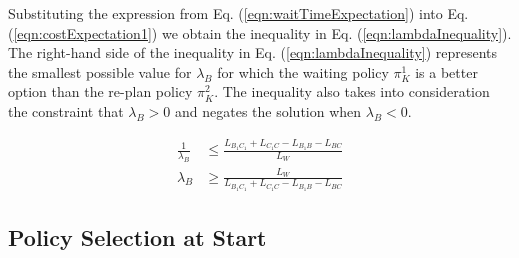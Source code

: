 \documentclass[a4paper,12pt]{article}
\begin{document}
			Substituting the expression from Eq. (\ref{eqn:waitTimeExpectation}) into Eq. (\ref{eqn:costExpectation1}) we obtain the inequality in Eq. (\ref{eqn:lambdaInequality}). The right-hand side of the inequality in Eq. (\ref{eqn:lambdaInequality}) represents the smallest possible value for $\lambda_{B}$ for which the waiting policy $\pi_K^1$ is a better option than the re-plan policy $\pi_K^2$. The inequality also takes into consideration the constraint that $\lambda_{B} > 0$ and negates the solution when $\lambda_{B} < 0$.
			
			\begin{equation}
			\begin{split}
			\frac{1}{\lambda_{B}} & \leq \frac{L_{B_{1}C_{1}} + L_{C_{1}C} - L_{B_{1}B} - L_{BC}}{L_W} \\	
			\lambda_{B} & \geq \frac{L_W}{L_{B_{1}C_{1}} + L_{C_{1}C} - L_{B_{1}B} - L_{BC}}
			\end{split}
			\label{eqn:lambdaInequality}
			\end{equation}
		
		\subsection{Policy Selection at Start}
		\label{sec:policySelectionAtStart}
		
\end{document}
